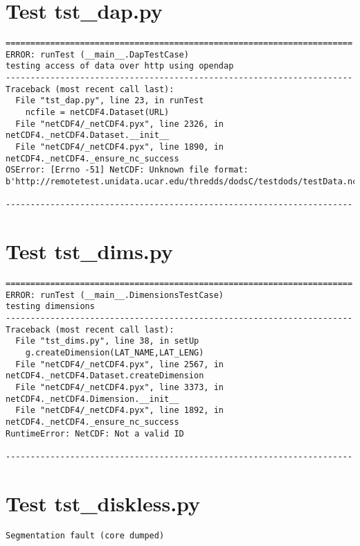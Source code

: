 \section{Test tst\_dap.py}

\begin{verbatim}
======================================================================
ERROR: runTest (__main__.DapTestCase)
testing access of data over http using opendap
----------------------------------------------------------------------
Traceback (most recent call last):
  File "tst_dap.py", line 23, in runTest
    ncfile = netCDF4.Dataset(URL)
  File "netCDF4/_netCDF4.pyx", line 2326, in netCDF4._netCDF4.Dataset.__init__
  File "netCDF4/_netCDF4.pyx", line 1890, in netCDF4._netCDF4._ensure_nc_success
OSError: [Errno -51] NetCDF: Unknown file format: b'http://remotetest.unidata.ucar.edu/thredds/dodsC/testdods/testData.nc'

----------------------------------------------------------------------

\end{verbatim}

\section{Test tst\_dims.py}

\begin{verbatim}
======================================================================
ERROR: runTest (__main__.DimensionsTestCase)
testing dimensions
----------------------------------------------------------------------
Traceback (most recent call last):
  File "tst_dims.py", line 38, in setUp
    g.createDimension(LAT_NAME,LAT_LENG)
  File "netCDF4/_netCDF4.pyx", line 2567, in netCDF4._netCDF4.Dataset.createDimension
  File "netCDF4/_netCDF4.pyx", line 3373, in netCDF4._netCDF4.Dimension.__init__
  File "netCDF4/_netCDF4.pyx", line 1892, in netCDF4._netCDF4._ensure_nc_success
RuntimeError: NetCDF: Not a valid ID

----------------------------------------------------------------------

\end{verbatim}

\section{Test tst\_diskless.py}

\begin{verbatim}
Segmentation fault (core dumped)
\end{verbatim}

